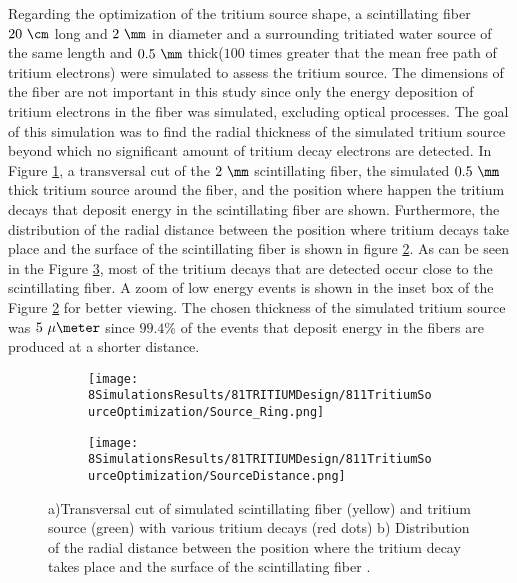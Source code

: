 Regarding the optimization of the tritium source shape, a scintillating fiber $20~\cm$ long and $2~\mm$ in diameter and a surrounding tritiated water source of the same length and $0.5~\mm$ thick($100$ times greater that the mean free path of tritium electrons) were simulated to assess the tritium source. The dimensions of the fiber are not important in this study since only the energy deposition of tritium electrons in the fiber was simulated, excluding optical processes. The goal of this simulation was to find the radial thickness of the simulated tritium source beyond which no significant amount of tritium decay electrons are detected. In Figure \ref{subfig:TransversalCutTritiumSource}, a transversal cut of the $2~\mm$ scintillating fiber, the simulated $0.5~\mm$ thick tritium source around the fiber, and the position where happen the tritium decays that deposit energy in the scintillating fiber are shown. Furthermore, the distribution of the radial distance between the position where tritium decays take place and the surface of the scintillating fiber is shown in figure \ref{subfig:DistanceDistributionTritiumSourceFiber}. As can be seen in the Figure \ref{fig:TritiumSourceSimulated}, most of the tritium decays that are detected occur close to the scintillating fiber.  A zoom of low energy events is shown in the inset box of the Figure \ref{subfig:DistanceDistributionTritiumSourceFiber} for better viewing. The chosen thickness of the simulated tritium source was $5~\mu\meter$ since $99.4\%$ of the events that deposit energy in the fibers are produced at a shorter distance.

\begin{figure}
\centering
    \begin{subfigure}[b]{0.45\textwidth}
    \centering
    \texttt{[image: 8SimulationsResults/81TRITIUMDesign/811TritiumSourceOptimization/Source\_Ring.png]}  
    \caption{\label{subfig:TransversalCutTritiumSource}}
    \end{subfigure}
    \hfill
    \begin{subfigure}[b]{0.45\textwidth}
    \centering
    \texttt{[image: 8SimulationsResults/81TRITIUMDesign/811TritiumSourceOptimization/SourceDistance.png]}  
    \caption{\label{subfig:DistanceDistributionTritiumSourceFiber}}
    \end{subfigure}
 \caption{a)Transversal cut of simulated scintillating fiber (yellow) and tritium source (green) with various tritium decays (red dots) b) Distribution of the radial distance between the position where the tritium decay takes place and the surface of the scintillating fiber \cite{SimulationPaperCarlos}.}
 \label{fig:TritiumSourceSimulated}
\end{figure}	

